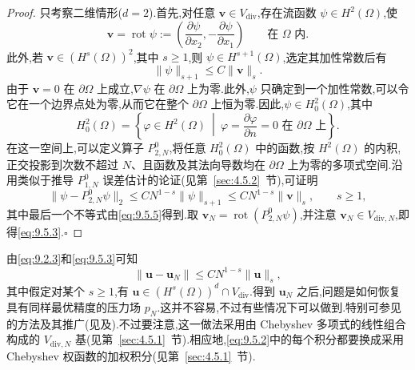 \begin{proof}
只考察二维情形(\(d=2\)).首先,对任意 \(\boldsymbol{v}\in V_{\mathrm{div}}\),存在{\heiti 流函数} \(\psi\in H^2(\Omega)\),使
\begin{equation}\label{eq:9.5.4}
  \boldsymbol{v}=\operatorname{rot}\psi:=
     \left(\frac{\partial\psi}{\partial x_2},-\frac{\partial\psi}{\partial x_1}\right)
       \qquad\text{在 }\Omega\text{ 内}.
\end{equation}
此外,若 \(\boldsymbol{v}\in(H^s(\Omega))^2\),其中 \(s\ge1\),则 \(\psi\in H^{s+1}(\Omega)\),选定其加性常数后有
\begin{equation}\label{eq:9.5.5}
  \|\psi\|_{s+1}\le C\|\boldsymbol{v}\|_s.
\end{equation}
由于 \(\boldsymbol{v}=0\) 在 \(\partial\Omega\) 上成立,\(\nabla\psi\) 在 \(\partial\Omega\) 上为零.此外,\(\psi\) 只确定到一个加性常数,可以令它在一个边界点处为零,从而它在整个 \(\partial\Omega\) 上恒为零.因此,\(\psi\in H_0^2(\Omega)\),其中
\begin{equation}\label{eq:9.5.6}
  H_0^2(\Omega)=\left\{\varphi\in H^2(\Omega)\ \middle|\
      \varphi=\frac{\partial\varphi}{\partial n}=0\text{ 在 }\partial\Omega\text{ 上}\right\}.
\end{equation}
在这一空间上,可以定义算子 \(P_{2,N}^0\),将任意 \(H_0^2(\Omega)\) 中的函数,按 \(H^2(\Omega)\) 的内积,正交投影到次数不超过 \(N\)、且函数及其法向导数均在 \(\partial\Omega\) 上为零的多项式空间.沿用类似于推导 \(P_{1,N}^0\) 误差估计的论证(见第~\ref{sec:4.5.2}~节),可证明
\begin{equation}\label{eq:9.5.7}
  \|\psi-P_{2,N}^0\psi\|_2
       \le CN^{1-s}\|\psi\|_{s+1}\le CN^{1-s}\|\boldsymbol{v}\|_s,\qquad s\ge1,
\end{equation}
其中最后一个不等式由\eqref{eq:9.5.5}得到.取 \(\boldsymbol{v}_N=\operatorname{rot}(P_{2,N}^0\psi)\),并注意 \(\boldsymbol{v}_N\in V_{\mathrm{div},N}\),即得\eqref{eq:9.5.3}.\hfill\(\square\)
\end{proof}

由\eqref{eq:9.2.3}和\eqref{eq:9.5.3}可知
\begin{equation}\label{eq:9.5.8}
  \|\boldsymbol{u}-\boldsymbol{u}_N\|\le CN^{1-s}\|\boldsymbol{u}\|_s,
\end{equation}
其中假定对某个 \(s\ge1\),有 \(\boldsymbol{u}\in(H^s(\Omega))^d\cap V_{\mathrm{div}}\).得到 \(\boldsymbol{u}_N\) 之后,问题是如何恢复具有同样最优精度的压力场 \(p_N\).这并不容易,不过有些情况下可以做到.特别可参见的方法及其推广(见及).不过要注意,这一做法采用由 Chebyshev 多项式的线性组合构成的 \(V_{\mathrm{div},N}\) 基(见第~\ref{sec:4.5.1}~节).相应地,\eqref{eq:9.5.2}中的每个积分都要换成采用 Chebyshev 权函数的加权积分(见第~\ref{sec:4.5.1}~节).

